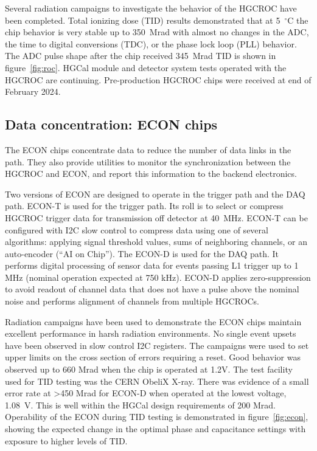 \documentclass[twocolumn]{webofc}
\begin{document}
Several radiation campaigns to investigate the behavior of the HGCROC have been completed. Total ionizing dose (TID) results demonstrated that at 5~$^{\circ}$C the chip behavior is very stable up to 350~Mrad  with almost no changes in the ADC, the time to digital conversions (TDC), or the phase lock loop (PLL) behavior. The ADC pulse shape after the chip received 345~Mrad TID is shown in figure~\ref{fig:roc}. HGCal module and detector system tests operated with the HGCROC are continuing. Pre-production HGCROC chips were received at end of February 2024.

\subsection{Data concentration: ECON chips}
\label{sec:econ}
The ECON chips concentrate data to reduce the number of data links in the path. They also provide utilities to monitor the synchronization between the HGCROC and ECON, and report this information to the backend electronics.

Two versions of ECON are designed to operate in the trigger path and the DAQ path. ECON-T is used for the trigger path. Its roll is to select or compress HGCROC trigger data for transmission off detector at 40~MHz. ECON-T can be configured with I2C slow control to compress data using one of several algorithms: applying signal threshold values, sums of neighboring channels, or an auto-encoder (“AI on Chip”). The ECON-D is used for the DAQ path. It performs digital processing of sensor data for events passing L1 trigger up to 1 MHz (nominal operation expected at 750 kHz). ECON-D applies zero-suppression to avoid readout of channel data that does not have a pulse above the nominal noise and performs alignment of channels from multiple HGCROCs.

Radiation campaigns have been used to demonstrate the ECON chips maintain excellent performance in harsh radiation environments. No single event upsets have been observed in slow control I2C registers. The campaigns were used to set upper limits on the cross section of errors requiring a reset. Good behavior was observed up to 660 Mrad when the chip is operated at 1.2V. The test facility used for TID testing was the CERN ObeliX X-ray. There was evidence of a small error rate at >450 Mrad for ECON-D when operated at the lowest voltage, 1.08~V. This is well within the HGCal design requirements of 200 Mrad. Operability of the ECON during TID testing is demonstrated in figure~\ref{fig:econ}, showing the expected change in the optimal phase and capacitance settings with exposure to higher levels of TID.
\end{document}
